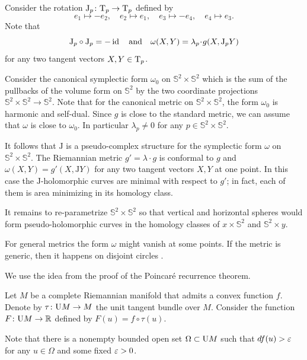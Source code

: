 Consider the rotation $\mathrm{J}_p\colon\mathrm{T}_p\to\mathrm{T}_p$ defined by 
\[ 
e_1\mapsto -e_2,
\quad 
e_2\mapsto e_1,
\quad 
e_3\mapsto -e_4,
\quad 
e_4\mapsto e_3.\]
Note that
\[\mathrm{J}_p\circ\mathrm{J}_p =-\id
\quad\text{and}\quad
\omega(X,Y)=\lambda_p\cdot g(X,\mathrm{J}_pY)\] 
for any two tangent vectors $X,Y\in \mathrm{T}_p$.

Consider the canonical symplectic form $\omega_0$ on $\mathbb{S}^2\times\mathbb{S}^2$ which is the sum of the pullbacks of the volume form on $\mathbb{S}^2$  
by the two coordinate projections $\mathbb{S}^2\times\mathbb{S}^2\to \mathbb{S}^2$.
Note that for the canonical metric on $\mathbb{S}^2\times\mathbb{S}^2$,
the form $\omega_0$ is harmonic and self-dual. 
Since $g$ is close to the standard metric,
we can assume that $\omega$ is close to $\omega_0$.
In particular $\lambda_p\ne0$ for any $p\in \mathbb{S}^2\times\mathbb{S}^2$.

It follows that $\mathrm{J}$ is a pseudo-complex structure for the symplectic form $\omega$ on $\mathbb{S}^2\times\mathbb{S}^2$.
The Riemannian metric $g'=\lambda\cdot g$ is conformal to $g$ and $\omega(X,Y)=g'(X,\mathrm{J} Y)$ 
for any two tangent vectors $X,Y$ at one point.
In this case the $\mathrm{J}$-holomorphic curves are minimal with respect to $g'$;
in fact, each of them is area minimizing in its homology class. 

It remains to re-parametrize $\mathbb{S}^2\times \mathbb{S}^2$
so that vertical and horizontal spheres would form pseudo-holomorphic curves in the homology classes of $x\times \mathbb{S}^2$ and $\mathbb{S}^2\times y$.
\qeds
 
 
For general metrics the form $\omega$ might vanish at some points.
If the metric is generic, then it happens on disjoint circles \cite{honda}.







We use the idea from the proof of the Poincar\'e recurrence theorem.

\medskip

Let $M$ be a complete Riemannian manifold that admits a convex function $f$.
Denote by $\tau\colon\mathrm{U} M\to M$ the unit tangent bundle over $M$. 
Consider the function $F\colon\mathrm{U} M\to \mathbb{R}$ defined by $F(u)=f\circ\tau(u)$.

Note that 
there is a nonempty bounded open set $\Omega\subset \mathrm{U} M$
such that $df(u)>\varepsilon$ for any $u\in \Omega$ and some fixed $\varepsilon>0$.

